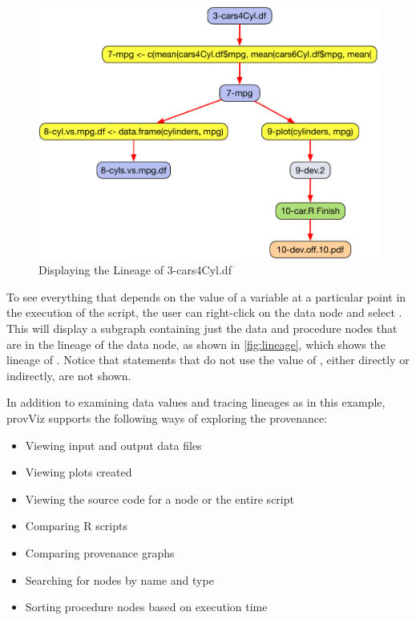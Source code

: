 \begin{figure}[p]
    \centering
    \includegraphics[width=.75\textwidth]{figures/car-lineage.pdf}
    \caption{Displaying the Lineage of 3-cars4Cyl.df}
    \label{fig:lineage}
\end{figure}

To see everything that depends on the value of a variable at a particular point in the execution of the script, the user can right-click on the data node and select .  This will display a subgraph containing just the data and procedure nodes that are in the lineage of the data node, as shown in \autoref{fig:lineage}, which shows the lineage of .  Notice that statements that do not use the value of , either directly or indirectly, are not shown.


In addition to examining data values and tracing lineages as in this example, provViz supports the following ways of exploring the provenance:

\begin{itemize}
    \item Viewing input and output data files
    \item Viewing plots created
    \item Viewing the source code for a node or the entire script
    \item Comparing R scripts
    \item Comparing provenance graphs
    \item Searching for nodes by name and type
    \item Sorting procedure nodes based on execution time
\end{itemize}

